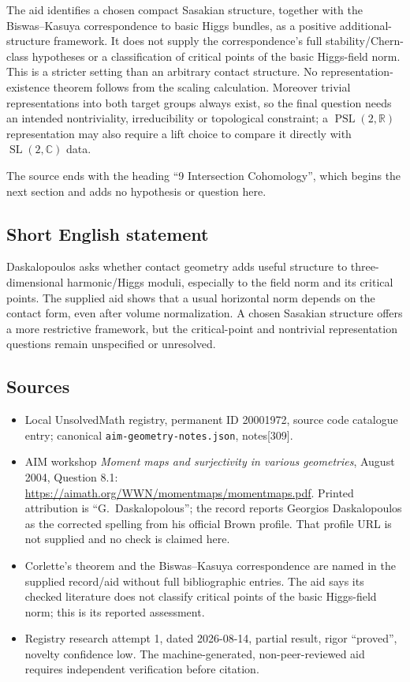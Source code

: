 \documentclass[11pt]{article}
\newcommand{\R}{\mathbb{R}}
\newcommand{\C}{\mathbb{C}}
\begin{document}
The aid identifies a chosen compact Sasakian structure, together with the Biswas--Kasuya correspondence to basic Higgs bundles, as a positive additional-structure framework. It does not supply the correspondence's full stability/Chern-class hypotheses or a classification of critical points of the basic Higgs-field norm. This is a stricter setting than an arbitrary contact structure. No representation-existence theorem follows from the scaling calculation. Moreover trivial representations into both target groups always exist, so the final question needs an intended nontriviality, irreducibility or topological constraint; a $\operatorname{PSL}(2,\R)$ representation may also require a lift choice to compare it directly with $\operatorname{SL}(2,\C)$ data.

The source ends with the heading ``9 Intersection Cohomology'', which begins the next section and adds no hypothesis or question here.
\subsection{Short English statement}
Daskalopoulos asks whether contact geometry adds useful structure to three-dimensional harmonic/Higgs moduli, especially to the field norm and its critical points. The supplied aid shows that a usual horizontal norm depends on the contact form, even after volume normalization. A chosen Sasakian structure offers a more restrictive framework, but the critical-point and nontrivial representation questions remain unspecified or unresolved.
\subsection{Sources}
\begin{itemize}
\item Local UnsolvedMath registry, permanent ID 20001972, source code catalogue entry; canonical \texttt{aim-geometry-notes.json}, notes[309].
\item AIM workshop \emph{Moment maps and surjectivity in various geometries}, August 2004, Question 8.1: \url{https://aimath.org/WWN/momentmaps/momentmaps.pdf}. Printed attribution is ``G.~Daskalopolous''; the record reports Georgios Daskalopoulos as the corrected spelling from his official Brown profile. That profile URL is not supplied and no check is claimed here.
\item Corlette's theorem and the Biswas--Kasuya correspondence are named in the supplied record/aid without full bibliographic entries. The aid says its checked literature does not classify critical points of the basic Higgs-field norm; this is its reported assessment.
\item Registry research attempt 1, dated 2026-08-14, partial result, rigor ``proved'', novelty confidence low. The machine-generated, non-peer-reviewed aid requires independent verification before citation.
\end{itemize}
\end{document}
